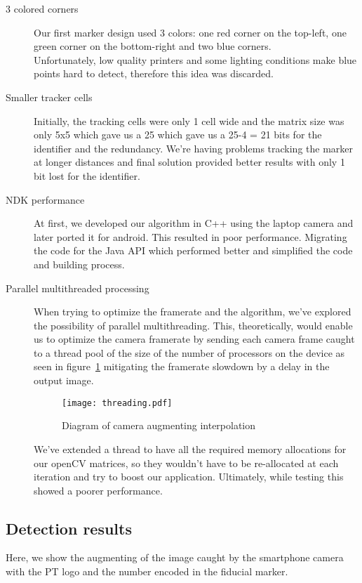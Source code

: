 \documentclass[DIV=calc, paper=a4, fontsize=11pt, twocolumn]{scrartcl}   %
\begin{document}
\begin{description}

\item[3 colored corners]
Our first marker design used 3 colors: one red corner on the top-left, one green corner on the bottom-right and two blue corners.\\
Unfortunately, low quality printers and some lighting conditions make blue points hard to detect, therefore this idea was discarded.

\item[Smaller tracker cells]
Initially, the tracking cells were only 1 cell wide and the matrix size was only 5x5 which gave us a 25 which gave us a 25-4 = 21 bits for the identifier and the redundancy.
We're having problems tracking the marker at longer distances and final solution provided better results with only 1 bit lost for the identifier.

\item[NDK performance]
At first, we developed our algorithm in C++ using the laptop camera and later ported it for android. This resulted in poor performance. Migrating the code for the Java API which performed better and simplified the code and building process.

\item[Parallel multithreaded processing]
When trying to optimize the framerate and the algorithm, we've explored the possibility of parallel multithreading. This, theoretically, would enable us to optimize the camera framerate by sending each camera frame caught to a thread pool of the size of the number of processors on the device as seen in figure~\ref{fig:threading} mitigating the framerate slowdown by a delay in the output image. 

\begin{figure}[!h]
    \centering
    \texttt{[image: threading.pdf]}
    \caption{Diagram of camera augmenting interpolation}
    \label{fig:threading}
\end{figure}

We've extended a thread to have all the required memory allocations for our openCV matrices, so they wouldn't have to be re-allocated at each iteration and try to boost our application.
Ultimately, while testing this showed a poorer performance.

\end{description}

\pagebreak

\subsection*{Detection results}
Here, we show the augmenting of the image caught by the smartphone camera with the PT logo and the number encoded in the fiducial marker.
\end{document}
